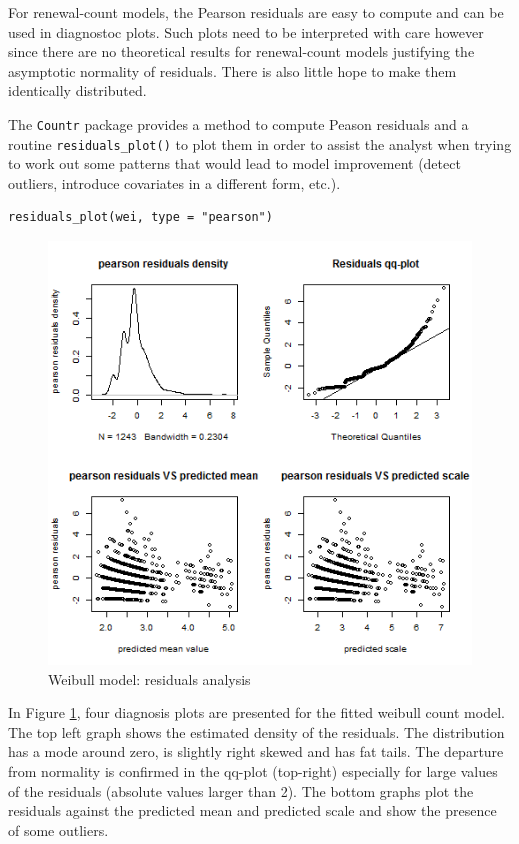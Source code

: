 \documentclass[a4paper,twoside,11pt]{article}
\begin{document}
For renewal-count models, the Pearson residuals are easy to compute and can be
used in diagnostoc plots. Such plots need to be interpreted with care however
since there are no theoretical results for renewal-count models justifying the
asymptotic normality of residuals. There is also little hope to make them
identically distributed.

The \texttt{Countr} package provides a method to compute Peason residuals and a routine
\texttt{residuals\_plot()} to plot them in order to assist the analyst when trying to
work out some patterns that would lead to model improvement (detect outliers,
introduce covariates in a different form, etc.).

\begin{verbatim}
residuals_plot(wei, type = "pearson")
\end{verbatim}


\begin{figure}[htbp]
\centering
\includegraphics[width=.9\linewidth]{wei_residuals.png}
\caption{\label{fig:org56d5660}
Weibull model: residuals analysis}
\end{figure}

In Figure \ref{fig:org56d5660}, four diagnosis plots are presented for the
fitted weibull count model. The top left graph shows the estimated density of
the residuals. The distribution has a mode around zero, is slightly right skewed
and has fat tails. The departure from normality is confirmed in the qq-plot
(top-right) especially for large values of the residuals (absolute values larger
than 2). The bottom graphs plot the residuals against the predicted mean and
predicted scale and show the presence of some outliers.
\end{document}
